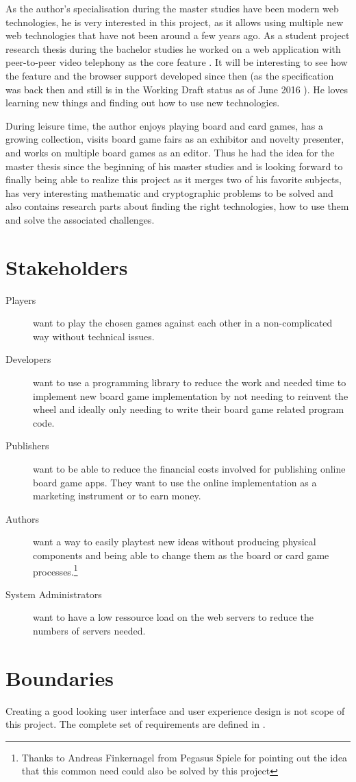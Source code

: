 As the author's specialisation during the master studies have been modern web
technologies, he is very interested in this project, as it allows using multiple
new web technologies that have not been around a few years ago. As a student
project research thesis during the bachelor studies he worked on a web
application with \gls{peer-to-peer} video telephony as the core feature
\cite{blaser2013practical}. It will be interesting to see how the feature and
the browser support developed since then (as the specification was back then and
still is in the Working Draft status as of June 2016 \cite{w3c2016webrtc}). He
loves learning new things and finding out how to use new technologies.

During leisure time, the author enjoys playing board and card games, has a
growing collection, visits board game fairs as an exhibitor and novelty
presenter, and works on multiple board games as an editor. Thus he had the idea
for the master thesis since the beginning of his master studies and is looking
forward to finally being able to realize this project as it merges two of his
favorite subjects, has very interesting mathematic and cryptographic problems to
be solved and also contains research parts about finding the right
technologies, how to use them and solve the associated challenges.

\section{Stakeholders}

\begin{description}
  \item[Players] want to play the chosen games against each other in a
  non-complicated way without technical issues.
  \item[Developers] want to use a programming library to reduce the work and
  needed time to implement new board game implementation by not needing to
  reinvent the wheel and ideally only needing to write their board game related program code.
  \item[Publishers] want to be able to reduce the financial costs
  involved for publishing online board game apps. They want to use the online
  implementation as a marketing instrument or to earn money.
  \item[Authors] want a way to easily playtest new ideas without producing
  physical components and being able to change them as the board or card game
  processes.\footnote{Thanks to Andreas Finkernagel from Pegasus Spiele for
  pointing out the idea that this common need could also be solved by this
  project}
  \item[System Administrators] want to have a low ressource load on the web
  servers to reduce the numbers of servers needed.
\end{description}

\section{Boundaries}

Creating a good looking user interface and user experience design is not scope
of this project. The complete set of requirements are defined in
.
